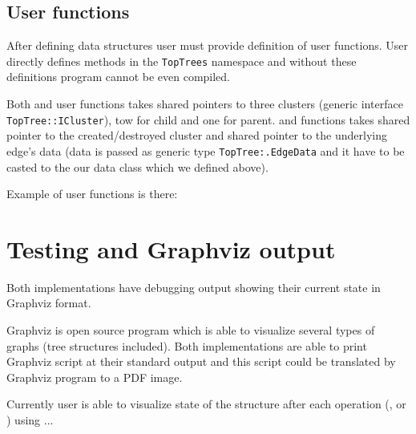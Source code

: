 \subsection{User functions}

After defining data structures user must provide definition of user functions.
User directly defines methods in the \texttt{TopTrees} namespace and without
these definitions program cannot be even compiled.

Both \Join{} and \Split{} user functions takes shared pointers to three clusters
(generic interface \texttt{TopTree::ICluster}), tow for child and one for parent.
\Create{} and \Destroy{} functions takes shared pointer to the created/destroyed
cluster and shared pointer to the underlying edge's data (data is passed as
generic type \texttt{TopTree:.EdgeData} and it have to be casted to the our data
class which we defined above).

Example of user functions is there:


\section{Testing and Graphviz output}

Both implementations have debugging output showing their current state
in Graphviz format.

Graphviz is open source program which is able to visualize several types of
graphs (tree structures included). Both implementations are able to print
Graphviz script at their standard output and this script could be translated by
Graphviz program to a PDF image.

Currently user is able to visualize state of the structure after each operation
(\Cut, \Link or \Expose) using ... 
